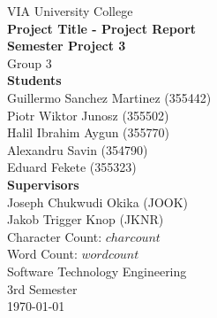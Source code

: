 \thispagestyle{empty}
\vspace*{0.15\textheight}
\begin{center}
    {\Large VIA University College}\\[2em]
    {\huge \textbf{Project Title - Project Report}}\\[0.5em]
    {\Large \textbf{Semester Project 3}}\\[0.5em]
    {\Large Group 3}\\[3em]
    {\large \textbf{Students}}\\[0.5em]
    {\large Guillermo Sanchez Martinez (355442)}\\[0.5em]
    {\large Piotr Wiktor Junosz (355502)}\\[0.5em]
    {\large Halil Ibrahim Aygun (355770)}\\[0.5em]
    {\large Alexandru Savin (354790)}\\[0.5em]
    {\large Eduard Fekete (355323)}\\[2em]
    {\large \textbf{Supervisors}}\\[0.5em]
    {\large Joseph Chukwudi Okika (JOOK)}\\[0.5em]
    {\large Jakob Trigger Knop (JKNR)}\\[2em]        
    {\large Character Count: $charcount$}\\[0.5em]
    {\large Word Count: $wordcount$}\\[2em]
    {\Large Software Technology Engineering}\\[1em]
    {\Large 3rd Semester}\\[1em]
    {\large \today}\\[1em]
\end{center}
\vfill
\clearpage